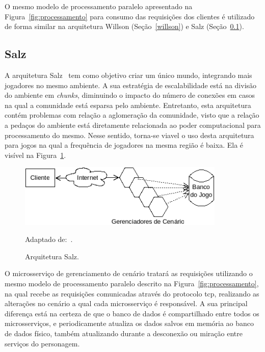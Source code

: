 O mesmo modelo de processamento paralelo apresentado na Figura~\ref{fig:processamento} para consumo das requisições dos clientes é utilizado de forma similar na arquitetura Willson (Seção~\ref{willson}) e Salz (Seção~\ref{salz}).


\subsection{Salz}
\label{salz}



A arquitetura Salz~\cite{albion_online_unite} tem como objetivo criar um único mundo, integrando mais jogadores no mesmo ambiente.
%
A sua estratégia de escalabilidade está na divisão do ambiente em \textit{chunks}, diminuindo o impacto do número de conexões em casos na qual a comunidade está esparsa pelo ambiente.
%
Entretanto, esta arquitetura contém problemas com relação a aglomeração da comunidade, visto que a relação a pedaços do ambiente está diretamente relacionada ao poder computacional para processamento do mesmo.
%
Nesse sentido, torna-se viavel o uso desta arquitetura para jogos na qual a frequência de jogadores na mesma região é baixa.
%
Ela é visível na Figura~\ref{fig:salz}.


\begin{figure}[htb!]
  \caption{Arquitetura Salz.}
  \label{fig:salz}
  \includegraphics[height=3cm]{img/cap3/salz.png}
  \centering

  Adaptado de:~\cite{albion_online_unite}.
\end{figure}


O microsserviço de gerenciamento de cenário tratará as requisições utilizando o mesmo modelo de processamento paralelo descrito na Figura~\ref{fig:processamento}, na qual recebe as requisições comunicadas através do protocolo \ac{tcp}, realizando as alterações no cenário a qual cada microsserviço é responsável.
%
A sua principal diferença está na certeza de que o banco de dados é compartilhado entre todos os microsserviços, e periodicamente atualiza os dados salvos em memória ao banco de dados físico, também atualizando durante a desconexão ou miração entre serviços do personagem.



